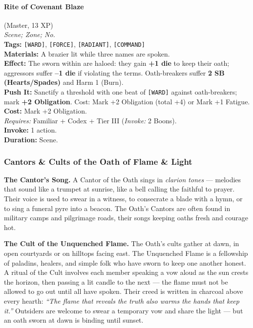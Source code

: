 \paragraph{Rite of Covenant Blaze} (Master, 13 XP) \hfill \\
\emph{Scene; Zone; No.} \\
\textbf{Tags:} \texttt{[WARD]}, \texttt{[FORCE]}, \texttt{[RADIANT]}, \texttt{[COMMAND]} \\
\textbf{Materials:} A brazier lit while three names are spoken. \\
\textbf{Effect:} The sworn within are haloed: they gain \textbf{+1 die} to keep their oath; aggressors suffer \textbf{--1 die} if violating the terms. Oath-breakers suffer \textbf{2 SB (Hearts/Spades)} and Harm 1 (Burn). \\
\textbf{Push It:} Sanctify a threshold with one beat of \texttt{[WARD]} against oath-breakers; mark \textbf{+2 Obligation}. Cost: Mark +2 Obligation (total +4) or Mark +1 Fatigue. \\
\textbf{Cost:} Mark +2 Obligation. \\
\textit{Requires:} Familiar + Codex + Tier III (\textit{Invoke:} 2 Boons). \\
\textbf{Invoke:} 1 action. \\
\textbf{Duration:} Scene.

\subsubsection*{Cantors \& Cults of the Oath of Flame \& Light}

\textbf{The Cantor's Song.} A Cantor of the Oath sings in \textit{clarion tones} --- melodies that sound like a trumpet at sunrise, like a bell calling the faithful to prayer. Their voice is used to swear in a witness, to consecrate a blade with a hymn, or to sing a funeral pyre into a beacon. The Oath's Cantors are often found in military camps and pilgrimage roads, their songs keeping oaths fresh and courage hot.

\textbf{The Cult of the Unquenched Flame.} The Oath's cults gather at dawn, in open courtyards or on hilltops facing east. The Unquenched Flame is a fellowship of paladins, healers, and simple folk who have sworn to keep one another honest. A ritual of the Cult involves each member speaking a vow aloud as the sun crests the horizon, then passing a lit candle to the next --- the flame must not be allowed to go out until all have spoken. Their creed is written in charcoal above every hearth: \textit{``The flame that reveals the truth also warms the hands that keep it.''} Outsiders are welcome to swear a temporary vow and share the light --- but an oath sworn at dawn is binding until sunset.

